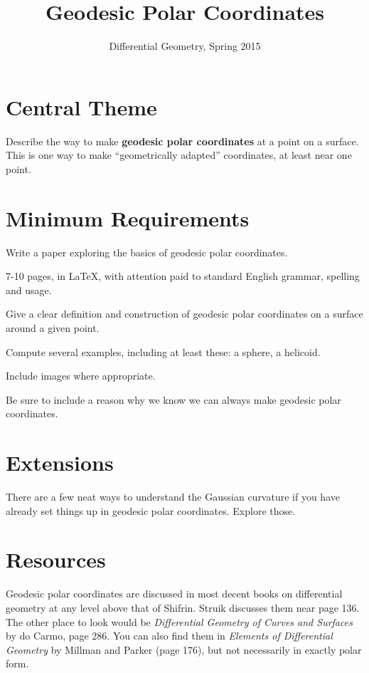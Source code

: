 \documentclass[12pt]{amsart}
\begin{document}
\title{Geodesic Polar Coordinates}
\author{Differential Geometry, Spring 2015}

\maketitle

\section*{Central Theme}

Describe the way to make \textbf{geodesic polar coordinates} at a point on a surface. This is one way to make ``geometrically adapted'' coordinates, at least near one point.

\section*{Minimum Requirements}

Write a paper exploring the basics of geodesic polar coordinates. 
\begin{compactitem}
\item 7-10 pages, in \LaTeX, with attention paid to standard English grammar, spelling and usage.
\item Give a clear definition and construction of geodesic polar coordinates on a surface around a given point.
\item Compute several examples, including at least these: a sphere, a helicoid.
\item Include images where appropriate.
\item Be sure to include a reason why we know we can always make geodesic polar coordinates.
\end{compactitem}

\section*{Extensions}

There are a few neat ways to understand the Gaussian curvature if you have already set things up in geodesic polar coordinates. Explore those.

\section*{Resources}

Geodesic polar coordinates are discussed in most decent books on differential geometry at any level above that of Shifrin. Struik discusses them near page 136. The other place to look would be \emph{Differential Geometry of Curves and Surfaces} by do Carmo, page 286.
You can also find them in \emph{Elements of Differential Geometry} by Millman and Parker (page 176), but not necessarily in exactly polar form.
\end{document}
